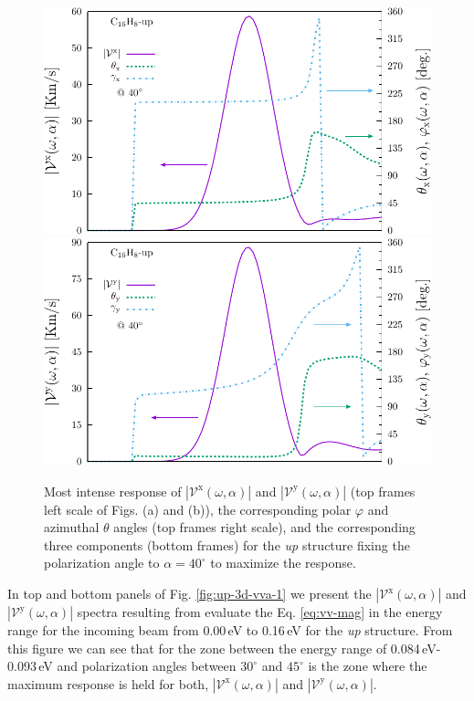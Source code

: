\documentclass[prb,11pt,tightenlines,twocolumn,aps]{revtex4-1}
\begin{document}
\begin{figure}[t]
    \centering
    \includegraphics[width=\linewidth]{upplots/up-vxb-rtp-m1}
    \\
    \includegraphics[width=\linewidth]{upplots/up-vyb-rtp-m1}
    
    \caption{Most intense response of
    $|\mathcal{V}^{\mathrm{x}}(\omega,\alpha)|$ and
    $|\mathcal{V}^{\mathrm{y}}(\omega,\alpha)|$ (top frames left scale of Figs.
    (a) and (b)), the corresponding polar $\varphi$ and azimuthal $\theta$
    angles (top frames right scale), and the corresponding three components
    (bottom frames) for the \emph{up} structure fixing the polarization angle to
    $\alpha=40^{\circ}$ to maximize the response.}
    \label{fig:up-vab-comp-rtp-1}
\end{figure}

In top and bottom panels of Fig. \ref{fig:up-3d-vva-1} we present the
$|\mathcal{V}^{\mathrm{x}}(\omega,\alpha)|$ and
$|\mathcal{V}^{\mathrm{y}}(\omega,\alpha)|$ spectra resulting from evaluate the
Eq. \eqref{eq:vv-mag} in the energy range for the incoming beam from 0.00\,eV to
0.16\,eV for the \emph{up} structure.
%
From this figure we can see that for the zone between the energy range of
0.084\,eV-0.093\,eV and polarization angles between $30^{\circ}$ and
$45^{\circ}$ is the zone where the maximum response is held for both,
$|\mathcal{V}^{\mathrm{x}}(\omega,\alpha)|$ and
$|\mathcal{V}^{\mathrm{y}}(\omega,\alpha)|$.
\end{document}
